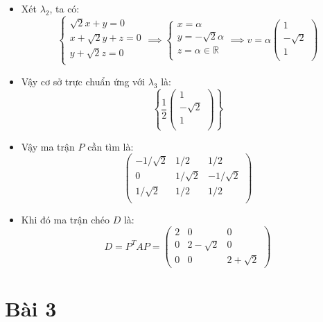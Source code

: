 \documentclass[a4paper, 12pt]{report}
\begin{document}
\begin{itemize}
    \item Xét $\lambda_2$, ta có:
    $$
    \begin{cases}
        \sqrt{2}x + y = 0 \\
        x + \sqrt{2}y + z = 0 \\
        y + \sqrt{2}z = 0 \\
    \end{cases}
    \implies
    \begin{cases}
        x = \alpha \\
        y = -\sqrt{2} \alpha \\
        z = \alpha \in \mathbb{R} \\
    \end{cases}
    \implies
    v = \alpha
    \begin{pmatrix}
        1 \\
        -\sqrt{2} \\
        1 \\
    \end{pmatrix}
    $$

    \item Vậy cơ sở trực chuẩn ứng với $\lambda_3$ là:
    $$
    \left\{
    \dfrac{1}{2}
    \begin{pmatrix}
        1 \\
        -\sqrt{2} \\
        1 \\
    \end{pmatrix}
    \right\}
    $$

    \item Vậy ma trận $P$ cần tìm là:
    $$
    \begin{pmatrix}
        -1/\sqrt{2} & 1/2 & 1/2 \\
        0 & 1/\sqrt{2} & -1/\sqrt{2} \\
        1/\sqrt{2} & 1/2 & 1/2 \\
    \end{pmatrix}
    $$

    \item Khi đó ma trận chéo $D$ là:
    $$
    D = P^TAP = \begin{pmatrix}
        2 & 0 & 0 \\
        0 & 2 - \sqrt{2} & 0 \\
        0 & 0 & 2 + \sqrt{2}
    \end{pmatrix}
    $$
\end{itemize}

\pagebreak
\section{Bài 3}
\end{document}
